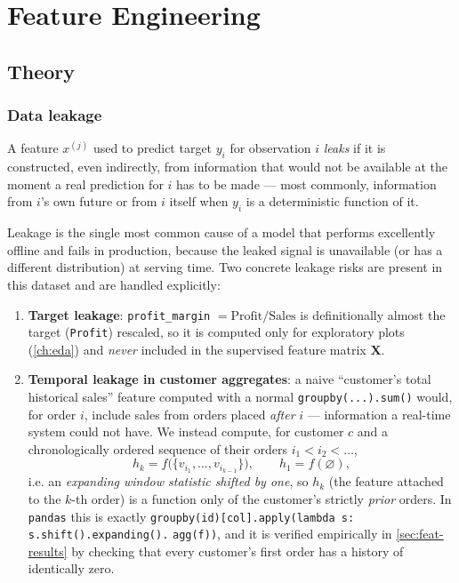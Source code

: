 \chapter{Feature Engineering}
\label{ch:features}

\section{Theory}

\subsection{Data leakage}
\begin{definition}[Leakage]
A feature $x^{(j)}$ used to predict target $y_i$ for observation $i$
\emph{leaks} if it is constructed, even indirectly, from information that
would not be available at the moment a real prediction for $i$ has to be
made — most commonly, information from $i$'s own future or from $i$
itself when $y_i$ is a deterministic function of it.
\end{definition}
Leakage is the single most common cause of a model that performs
excellently offline and fails in production, because the leaked signal
is unavailable (or has a different distribution) at serving time. Two
concrete leakage risks are present in this dataset and are handled
explicitly:
\begin{enumerate}[label=(\alph*)]
  \item \textbf{Target leakage}: \texttt{profit\_margin} $=
        \text{Profit}/\text{Sales}$ is definitionally almost the target
        (\texttt{Profit}) rescaled, so it is computed only for exploratory
        plots (\cref{ch:eda}) and \emph{never} included in the supervised
        feature matrix $\mathbf{X}$.
  \item \textbf{Temporal leakage in customer aggregates}: a naive
        ``customer's total historical sales'' feature computed with a
        normal \texttt{groupby(...).sum()} would, for order $i$, include
        sales from orders placed \emph{after} $i$ — information a
        real-time system could not have. We instead compute, for
        customer $c$ and a chronologically ordered sequence of their
        orders $i_1 < i_2 < \dots$,
        \begin{equation}
          h_k = f\bigl(\{v_{i_1}, \dots, v_{i_{k-1}}\}\bigr), \qquad
          h_1 = f(\varnothing),
          \label{eq:expanding}
        \end{equation}
        i.e. an \emph{expanding window statistic shifted by one}, so
        $h_k$ (the feature attached to the $k$-th order) is a function
        only of the customer's strictly \emph{prior} orders. In
        \texttt{pandas} this is exactly
        \texttt{groupby(id)[col].apply(lambda s: s.shift().expanding().}
        \texttt{agg(f))}, and it is verified empirically in
        \cref{sec:feat-results} by checking that every customer's first
        order has a history of identically zero.
\end{enumerate}

